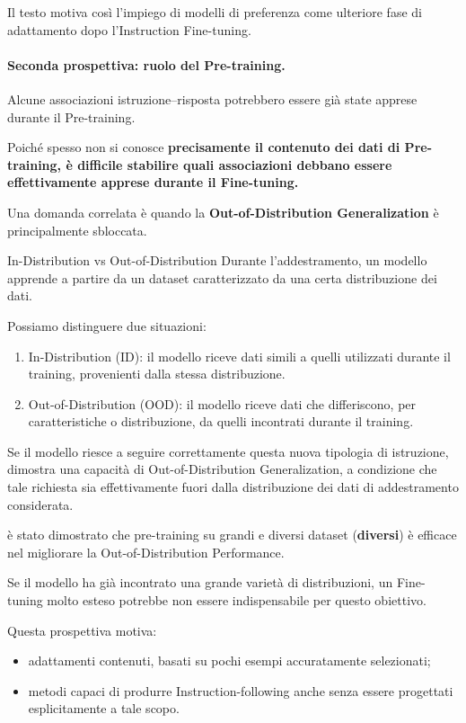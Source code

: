 Il testo motiva così l'impiego di modelli
di preferenza come ulteriore fase di adattamento
dopo l'Instruction Fine-tuning.

\paragraph{Seconda prospettiva: ruolo del Pre-training.}
Alcune associazioni istruzione--risposta
potrebbero essere già state apprese
durante il Pre-training.

Poiché spesso non si conosce \textbf{precisamente
il contenuto dei dati di Pre-training,
è difficile stabilire quali associazioni
debbano essere effettivamente apprese
durante il Fine-tuning.}


Una domanda correlata è quando la \textbf{Out-of-Distribution Generalization} è principalmente sbloccata.
\begin{observation}{In-Distribution vs Out-of-Distribution}
Durante l'addestramento, un modello apprende a partire da un dataset caratterizzato da una certa distribuzione dei dati.

Possiamo distinguere due situazioni:
\begin{enumerate}
    \item In-Distribution (ID): il modello riceve dati simili a quelli utilizzati durante il training, provenienti dalla stessa distribuzione.
    \item Out-of-Distribution (OOD): il modello riceve dati che differiscono, per caratteristiche o distribuzione, da quelli incontrati durante il training.
\end{enumerate}
Se il modello riesce a seguire correttamente questa nuova tipologia di istruzione, dimostra una capacità di Out-of-Distribution Generalization, a condizione che tale richiesta sia effettivamente fuori dalla distribuzione dei dati di addestramento considerata.
\end{observation}

è stato dimostrato che pre-training su grandi e diversi dataset (\textbf{diversi}) è efficace nel migliorare la Out-of-Distribution Performance.

Se il modello ha già incontrato
una grande varietà di distribuzioni,
un Fine-tuning molto esteso potrebbe
non essere indispensabile per questo obiettivo.

Questa prospettiva motiva:

\begin{itemize}
    \item adattamenti contenuti, basati su pochi esempi
    accuratamente selezionati;

    \item metodi capaci di produrre Instruction-following
    anche senza essere progettati esplicitamente
    a tale scopo.
\end{itemize}

